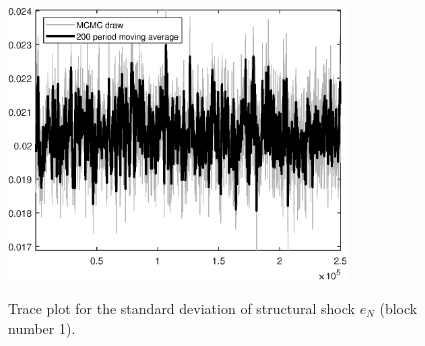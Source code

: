 \begin{figure}[H]
\centering
  \includegraphics[width=0.8\textwidth]{BRS_est_shopping/graphs/TracePlot_SE_e_N_blck_1}\\
    \caption{Trace plot for the standard deviation of structural shock ${e_N}$ (block number 1).}
\end{figure}

